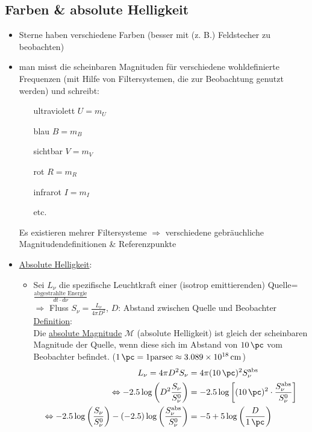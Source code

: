 \subsection{Farben \& absolute Helligkeit}
\begin{itemize}[label={$\to$}]
	\item Sterne haben verschiedene Farben (besser mit (z. B.) Feldstecher zu beobachten)
	\item man misst die scheinbaren Magnituden für verschiedene wohldefinierte Frequenzen (mit Hilfe von Filtersystemen, die zur Beobachtung genutzt werden) und schreibt:
		\begin{itemize}
			\item[ultraviolett] $U=m_U$
			\item[blau] $B=m_B$
			\item[sichtbar] $V=m_V$
			\item[rot] $R=m_R$
			\item[infrarot] $I=m_I$
			\item[] etc.
		\end{itemize}
		Es existieren mehrer Filtersysteme $\Rightarrow $ verschiedene gebräuchliche Magnitudendefinitionen \& Referenzpunkte
	\item \underline{Absolute Helligkeit}:
		\begin{itemize}[label={$\bullet$}]
			\item Sei $L_\nu$ die spezifische Leuchtkraft einer (isotrop emittierenden) Quelle=$\frac{\text{abgestrahlte Energie}}{dt\cdot d\nu}$\\
				$\Rightarrow$ Fluss $S_\nu=\frac{L_\nu}{4\pi D^2}$, $D$: Abstand zwischen Quelle und Beobachter\\
				\underline{Definition}:\\
				Die \underline{absolute Magnitude} $\mathcal{M}$ (absolute Helligkeit) ist gleich der scheinbaren Magnitude der Quelle, wenn diese sich im Abstand von $\SI{10}{\pc}$ vom Beobachter befindet. ($\SI{1}{\pc}=1 \text{parsec}\approx \SI{3.089e18}{\cm}$)
				\begin{align*}
					L_\nu=4\pi D^2S_\nu &=4\pi (\SI{10}{\pc})^2 S_\nu^{\text{abs}}\\
					\Leftrightarrow -\num{2.5}\log\left(D^2\frac{S_\nu}{S_\nu^0}\right)&=-\num{2.5}\log\left[(\SI{10}{\pc})^2\cdot\frac{S_\nu^{\text{abs}}}{S_\nu^0}\right]\\
					\Leftrightarrow -\num{2.5}\log\left(\frac{S_\nu}{S_\nu^0}\right)-(-\num{2.5})\log\left(\frac{S_\nu^{\text{abs}}}{S_\nu^0}\right)&=-5+5\log\left(\frac{D}{\SI{1}{\pc}}\right)\\

\end{align*}
\end{itemize}
\end{itemize}
